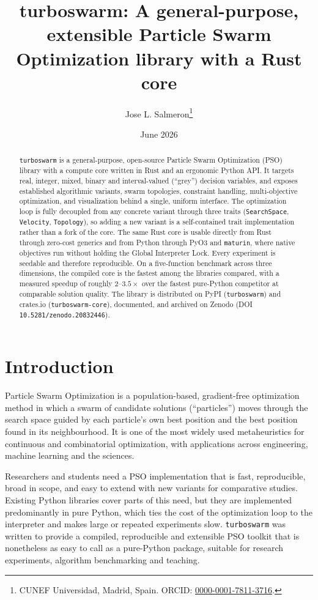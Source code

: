 \documentclass[11pt]{article}
\title{\textbf{turboswarm}: A general-purpose, extensible Particle Swarm
Optimization library with a Rust core}
\author{Jose L. Salmeron\thanks{CUNEF Universidad, Madrid, Spain. ORCID:
\href{https://orcid.org/0000-0001-7811-3716}{0000-0001-7811-3716}.}}
\date{June 2026}
\begin{document}
\maketitle

\begin{abstract}
\noindent
\texttt{turboswarm} is a general-purpose, open-source Particle Swarm
Optimization (PSO) library with a compute core written in Rust and an ergonomic
Python API. It targets real, integer, mixed, binary and interval-valued
(``grey'') decision variables, and exposes established algorithmic variants,
swarm topologies, constraint handling, multi-objective optimization, and
visualization behind a single, uniform interface. The optimization loop is
fully decoupled from any concrete variant through three traits
(\texttt{SearchSpace}, \texttt{Velocity}, \texttt{Topology}), so adding a new
variant is a self-contained trait implementation rather than a fork of the core.
The same Rust core is usable directly from Rust through zero-cost generics and
from Python through PyO3 and \texttt{maturin}, where native objectives run
without holding the Global Interpreter Lock. Every experiment is seedable and
therefore reproducible. On a five-function benchmark across three dimensions,
the compiled core is the fastest among the libraries compared, with a measured
speedup of roughly $2$--$3.5\times$ over the fastest pure-Python competitor at
comparable solution quality. The library is distributed on PyPI
(\texttt{turboswarm}) and crates.io (\texttt{turboswarm-core}), documented, and
archived on Zenodo (DOI \texttt{10.5281/zenodo.20832446}).
\end{abstract}

\section{Introduction}

Particle Swarm Optimization \citep{kennedy1995particle} is a population-based,
gradient-free optimization method in which a swarm of candidate solutions
(``particles'') moves through the search space guided by each particle's own
best position and the best position found in its neighbourhood. It is one of the
most widely used metaheuristics for continuous and combinatorial optimization,
with applications across engineering, machine learning and the sciences.

Researchers and students need a PSO implementation that is fast, reproducible,
broad in scope, and easy to extend with new variants for comparative studies.
Existing Python libraries cover parts of this need, but they are implemented
predominantly in pure Python, which ties the cost of the optimization loop to
the interpreter and makes large or repeated experiments slow. \texttt{turboswarm}
was written to provide a compiled, reproducible and extensible PSO toolkit that
is nonetheless as easy to call as a pure-Python package, suitable for research
experiments, algorithm benchmarking and teaching.
\end{document}
